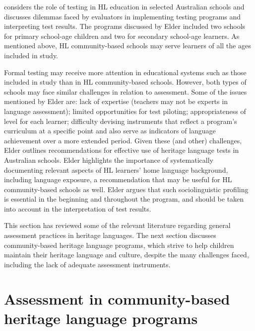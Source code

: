 \documentclass[output=paper]{langscibook}
\begin{document}
\citet{Elder2005} considers the role of testing in HL education in selected Australian schools and discusses dilemmas faced by evaluators in implementing testing programs and interpreting test results. The programs discussed by Elder included two schools for primary school-age children and two for secondary school-age learners. As mentioned above, HL community-based schools may serve learners of all the ages included in  study.

Formal testing may receive more attention in educational systems such as those included in  study than in HL community-based schools. However, both types of schools may face similar challenges in relation to assessment. Some of the issues mentioned by Elder are: lack of expertise (teachers may not be experts in language assessment); limited opportunities for test piloting; appropriateness of level for each learner; difficulty devising instruments that reflect a program’s curriculum at a specific point and also serve as indicators of language achievement over a more extended period. Given these (and other) challenges, Elder outlines recommendations for effective use of heritage language tests in Australian schools. Elder highlights the importance of systematically documenting relevant aspects of HL learners’ home language background, including language exposure, a recommendation that may be useful for HL community-based schools as well. Elder argues that such sociolinguistic profiling is essential in the beginning and throughout the program, and should be taken into account in the interpretation of test results.

  This section has reviewed some of the relevant literature regarding general assessment practices in heritage languages. The next section discusses community-based heritage language programs, which strive to help children maintain their heritage language and culture, despite the many challenges faced, including the lack of adequate assessment instruments.

\section{Assessment in community-based heritage language programs}\label{sec:6:3}
\end{document}
